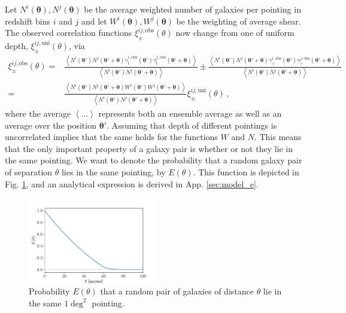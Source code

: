 \documentclass[referee]{aa} %
\renewcommand{\[}{\begin{equation}}
\renewcommand{\]}{\end{equation}}
\renewcommand{\rm}{\mathrm}
\def\b#1{\bm{#1}}
\def\la{\left<}
\def\ra{\right>}
\def\bthp{\b \theta' + \b \theta}
\def\bth{\b \theta'}
\begin{document}
Let $N^i(\b \theta),N^j(\b\theta)$ be the average weighted number of galaxies per pointing in redshift bins $i$ and $j$ and let $W^i(\b \theta),W^j(\b\theta)$ be the weighting of average shear. The observed correlation functions $\xi^{ij,\text{obs}}_\pm(\theta)$ now change from one of uniform depth, $\xi_\pm^{ij,\rm{uni}}(\theta)$, via \citep[see][]{2002A&A...396....1S}
\begin{align}
\xi^{ij,\text{obs}}_\pm(\theta) = & \frac{\la N^i(\bth)N^j(\bthp)\gamma^{i,\rm{obs}}_{\rm t}(\bth)\gamma^{j,\rm{obs}}_{\rm t}(\bthp)\ra }{\la N^i(\bth)N^j(\bthp)\ra} \pm \frac{\la N^i(\bth)N^j(\bthp)\gamma^{i,\rm{obs}}_\times(\bth)\gamma^{j,\rm{obs}}_\times(\bthp)\ra }{\la N^i(\bth)N^j(\bthp)\ra} \nonumber\\
 = & \frac{\la N^i(\bth)N^j(\bthp)W^i(\bth)W^j(\bthp)\ra}{\la N^i(\bth)N^j(\bthp)\ra} \xi_{\pm}^{ij,\rm{uni}}(\theta) \, ,
 \label{eq:xipmblub1}
 \end{align}
 where the average $\la\ldots\ra$ represents both an ensemble average as well as an average over the position $\bth$.
 Assuming that depth of different pointings is uncorrelated implies that the same holds for the functions $W$ and $N$. This means that the only important property of a galaxy pair is whether or not they lie in the same pointing. We want to denote the probability that a random galaxy pair of separation $\theta$ lies in the same pointing, by $E(\theta)$. This function is depicted in Fig. \ref{fig:eoftheta_lin}, and an analytical expression is derived in App. \ref{sec:model_e}.
 
\begin{figure}
 \centering
 \includegraphics[width=0.5\textwidth]{images/eoftheta.pdf}
 \caption{Probability $E(\theta)$ that a random pair of galaxies of distance $\theta$ lie in the same $1\deg ^2$ pointing.}
 \label{fig:eoftheta_lin}
\end{figure}
\end{document}
